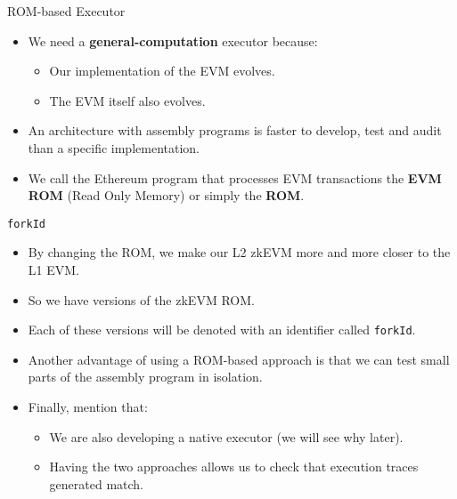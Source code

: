 \begin{frame}{ROM-based Executor}
\begin{itemize}
\item We need a \textbf{general-computation} executor because:
  \begin{itemize}
  \item Our implementation of the EVM evolves.
  \item The EVM itself also evolves.
  \end{itemize}

\item An architecture with assembly programs is faster to develop, test and audit than a specific implementation.

\item We call the Ethereum program that processes EVM transactions the \textbf{EVM ROM} (Read Only Memory) or simply the \textbf{ROM}.
\end{itemize}
\end{frame}




\begin{frame}{\texttt{forkId}}
\begin{itemize}
\item By changing the ROM, we make our L2 zkEVM more and more closer to the L1 EVM.
\item So we have versions of the zkEVM ROM.
\item Each of these versions will be denoted with an identifier called
\texttt{forkId}.
\item Another advantage of using a ROM-based approach is that we can test small parts of the assembly program
in isolation.
\item Finally, mention that:
  \begin{itemize}
  \item We are also developing a native executor (we will see why later).
  \item Having the two approaches allows us to check that execution traces generated match.
  \end{itemize}
\end{itemize}
\end{frame}




